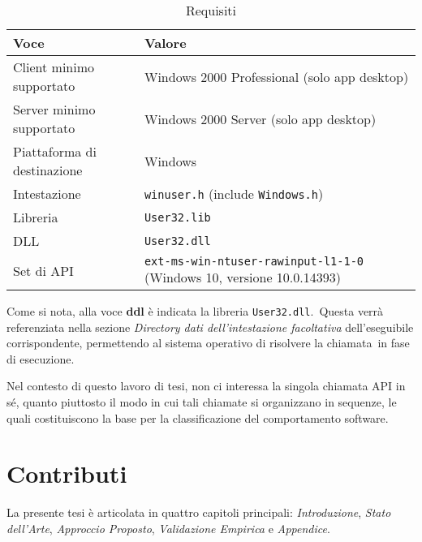 \begin{table}[ht]
      \centering
      \caption{Requisiti}
      \label{tab:GetKeyboardState-Requisiti}
      \begin{tabular}{ll}
            \toprule
            \textbf{Voce}               & \textbf{Valore}                                                              \\
            \midrule
            Client minimo supportato    & Windows 2000 Professional (solo app desktop)                                 \\
            Server minimo supportato    & Windows 2000 Server (solo app desktop)                                       \\
            Piattaforma di destinazione & Windows                                                                      \\
            Intestazione                & \texttt{winuser.h} (include \texttt{Windows.h})                              \\
            Libreria                    & \texttt{User32.lib}                                                          \\
            DLL                         & \texttt{User32.dll}                                                          \\
            Set di API                  & \texttt{ext-ms-win-ntuser-rawinput-l1-1-0} (Windows 10, versione 10.0.14393) \\
            \bottomrule
      \end{tabular}
\end{table}

Come si nota, alla voce \textbf{ddl} è indicata la libreria \texttt{User32.dll}.\
Questa verrà referenziata nella sezione \textit{Directory dati dell’intestazione facoltativa} dell’eseguibile corrispondente, permettendo al sistema operativo di risolvere la chiamata\
in fase di esecuzione.

Nel contesto di questo lavoro di tesi, non ci interessa la singola chiamata API in sé, quanto piuttosto il modo in cui tali chiamate si organizzano in sequenze,
le quali costituiscono la base per la classificazione del comportamento software.

\section{Contributi}

La presente tesi è articolata in quattro capitoli principali: \textit{Introduzione}, \textit{Stato dell'Arte},
\textit{Approccio Proposto}, \textit{Validazione Empirica} e \textit{Appendice}.

